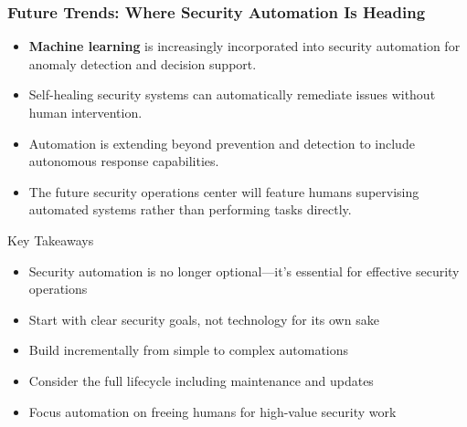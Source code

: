 \documentclass{beamer}
\begin{document}
\begin{frame}
  \frametitle{Future Trends: Where Security Automation Is Heading}
  
  \begin{itemize}
    \item \textbf{Machine learning} is increasingly incorporated into security automation for anomaly detection and decision support.
    \item Self-healing security systems can automatically remediate issues without human intervention.
    \item Automation is extending beyond prevention and detection to include autonomous response capabilities.
    \item The future security operations center will feature humans supervising automated systems rather than performing tasks directly.
  \end{itemize}
  
  \begin{alertblock}{Key Takeaways}
    \scriptsize
    \begin{itemize}
      \item Security automation is no longer optional—it's essential for effective security operations
      \item Start with clear security goals, not technology for its own sake
      \item Build incrementally from simple to complex automations
      \item Consider the full lifecycle including maintenance and updates
      \item Focus automation on freeing humans for high-value security work
    \end{itemize}
  \end{alertblock}
\end{frame}
\end{document}
